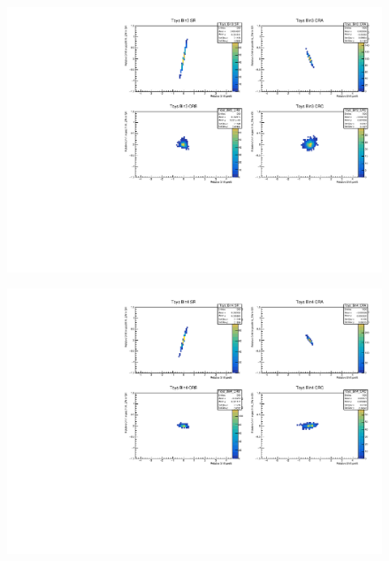 \begin{figure}[H]
\includegraphics[width=\textwidth]{plots/diffx/instab/constfx/instabilities_mjj_QCD_Mgraph_Signal_Sh2211_BSDATASTATS_sherpaasimov_bin3.pdf}
\end{figure}
\begin{figure}[H]
\includegraphics[width=\textwidth]{plots/diffx/instab/constfx/instabilities_mjj_QCD_Mgraph_Signal_Sh2211_BSDATASTATS_sherpaasimov_bin4.pdf}
\end{figure}

